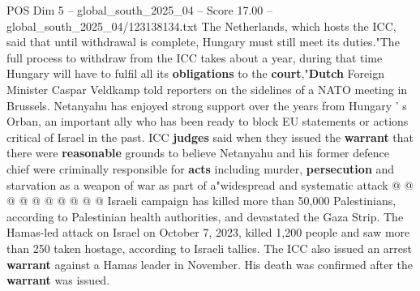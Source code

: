 \begin{textsample}{POS Dim 5 – global\_south\_2025\_04 – Score 17.00 – global\_south\_2025\_04/123138134.txt}
The Netherlands, which hosts the ICC, said that until withdrawal is complete, Hungary must still meet its duties."The full process to withdraw from the ICC takes about a year, during that time Hungary will have to fulfil all its \textbf{obligations} to the \textbf{court},"\textbf{Dutch} Foreign Minister Caspar Veldkamp told reporters on the sidelines of a NATO meeting in Brussels.
Netanyahu has enjoyed strong support over the years from Hungary ' s Orban, an important ally who has been ready to block EU statements or actions critical of Israel in the past.
ICC \textbf{judges} said when they issued the \textbf{warrant} that there were \textbf{reasonable} grounds to believe Netanyahu and his former defence chief were criminally responsible for \textbf{acts} including murder, \textbf{persecution} and starvation as a weapon of war as part of a"widespread and systematic attack @ @ @ @ @ @ @ @ @ @ Israeli campaign has killed more than 50,000 Palestinians, according to Palestinian health authorities, and devastated the Gaza Strip.
The Hamas-led attack on Israel on October 7, 2023, killed 1,200 people and saw more than 250 taken hostage, according to Israeli tallies.
The ICC also issued an arrest \textbf{warrant} against a Hamas leader in November.
His death was confirmed after the \textbf{warrant} was issued.

\end{textsample}
